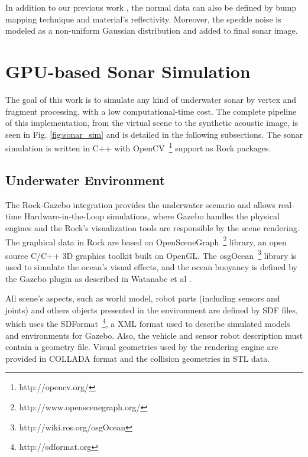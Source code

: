 \documentclass[final,5p,times]{elsarticle}
\begin{document}
In addition to our previous work \cite{cerqueira2016}, the normal data can also be defined by bump mapping technique and material's reflectivity. Moreover, the speckle noise is modeled as a non-uniform Gaussian distribution and added to final sonar image.


\section{GPU-based Sonar Simulation}
\label{dev}

The goal of this work is to simulate any kind of underwater sonar by vertex and fragment processing, with a low computational-time cost. The complete pipeline of this implementation, from the virtual scene to the synthetic acoustic image, is seen in Fig. \ref{fig:sonar_sim} and is detailed in the following subsections. The sonar simulation is written in C++ with OpenCV~\footnote{http://opencv.org/} support as Rock packages.


\subsection{Underwater Environment}
\label{dev:uwscene}

The Rock-Gazebo integration \cite{watanabe2015} provides the underwater scenario and allows real-time Hardware-in-the-Loop simulations, where Gazebo handles the physical engines and the Rock's visualization tools are responsible by the scene rendering. The graphical data in Rock are based on OpenSceneGraph~\footnote{http://www.openscenegraph.org/} library, an open source C/C++ 3D graphics toolkit built on OpenGL. The osgOcean~\footnote{http://wiki.ros.org/osgOcean} library is used to simulate the ocean's visual effects, and the ocean buoyancy is defined by the Gazebo plugin as described in Watanabe et al \cite{watanabe2015}.

All scene's aspects, such as world model, robot parts (including sensors and joints) and others objects presented in the environment are defined by SDF files, which uses the SDFormat~\footnote{http://sdformat.org}, a XML format used to describe simulated models and environments for Gazebo. Also, the vehicle and sensor robot description must contain a geometry file. Visual geometries used by the rendering engine are provided in COLLADA format and the collision geometries in STL data.
\end{document}
